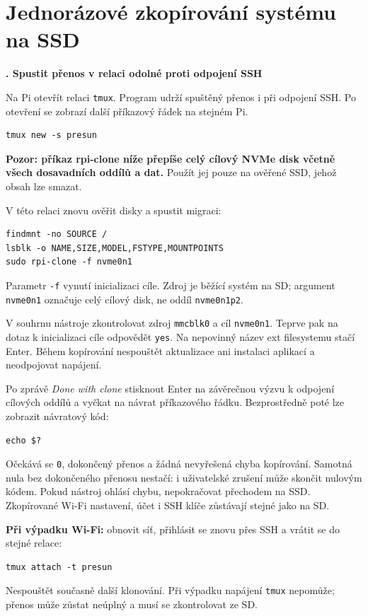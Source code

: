 \documentclass[11pt,a4paper]{article}
\newcounter{postup}
\newcommand{\krok}[1]{\refstepcounter{postup}\par\vspace{0.25em}\textbf{\thepostup. #1}\par}
\begin{document}
\clearpage
\section{Jednorázové zkopírování systému na SSD}
\krok{Spustit přenos v relaci odolné proti odpojení SSH}
Na Pi otevřít relaci \texttt{tmux}. Program udrží spuštěný přenos i při odpojení SSH. Po otevření se zobrazí další příkazový řádek na stejném Pi.\cite{tmux}
\begin{lstlisting}
tmux new -s presun
\end{lstlisting}
\textbf{Pozor: příkaz rpi-clone níže přepíše celý cílový NVMe disk včetně všech dosavadních oddílů a dat.} Použít jej pouze na ověřené SSD, jehož obsah lze smazat.

V této relaci znovu ověřit disky a spustit migraci:
\begin{lstlisting}
findmnt -no SOURCE /
lsblk -o NAME,SIZE,MODEL,FSTYPE,MOUNTPOINTS
sudo rpi-clone -f nvme0n1
\end{lstlisting}
Parametr \texttt{-f} vynutí inicializaci cíle. Zdroj je běžící systém na SD; argument \texttt{nvme0n1} označuje celý cílový disk, ne oddíl \texttt{nvme0n1p2}.\cite{clone-code}

V souhrnu nástroje zkontrolovat zdroj \texttt{mmcblk0} a cíl \texttt{nvme0n1}. Teprve pak na dotaz k inicializaci cíle odpovědět \texttt{yes}. Na nepovinný název ext filesystemu stačí Enter. Během kopírování nespouštět aktualizace ani instalaci aplikací a neodpojovat napájení.

Po zprávě \emph{Done with clone} stisknout Enter na závěrečnou výzvu k odpojení cílových oddílů a vyčkat na návrat příkazového řádku. Bezprostředně poté lze zobrazit návratový kód:
\begin{lstlisting}
echo $?
\end{lstlisting}
Očekává se \texttt{0}, dokončený přenos a žádná nevyřešená chyba kopírování. Samotná nula bez dokončeného přenosu nestačí: i uživatelské zrušení může skončit nulovým kódem. Pokud nástroj ohlásí chybu, nepokračovat přechodem na SSD. Zkopírované Wi-Fi nastavení, účet i SSH klíče zůstávají stejné jako na SD.\cite{clone-code}

\textbf{Při výpadku Wi-Fi:} obnovit síť, přihlásit se znovu přes SSH a vrátit se do stejné relace:
\begin{lstlisting}
tmux attach -t presun
\end{lstlisting}
Nespouštět současně další klonování. Při výpadku napájení \texttt{tmux} nepomůže; přenos může zůstat neúplný a musí se zkontrolovat ze SD.
\end{document}
